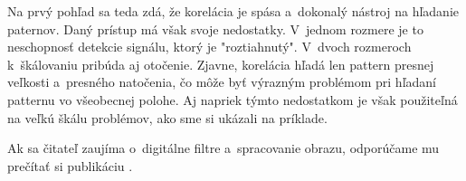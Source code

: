 Na prvý pohľad sa teda zdá, že korelácia je spása a~dokonalý nástroj
na hľadanie paternov. Daný prístup má však svoje nedostatky. V~jednom
rozmere je to neschopnosť detekcie signálu, ktorý je "roztiahnutý". 
V~dvoch rozmeroch k~škálovaniu pribúda aj otočenie. Zjavne, korelácia hľadá len
pattern presnej veľkosti a~presného natočenia, čo môže byť výrazným
problémom pri hľadaní patternu vo všeobecnej polohe. Aj napriek týmto
nedostatkom je však použiteľná na veľkú škálu problémov, ako sme si
ukázali na príklade.

\begin{poznamka}
    Ak sa čitateľ zaujíma o~digitálne filtre a~spracovanie obrazu,
    odporúčame mu prečítať si publikáciu \cite{dspguide}.
\end{poznamka}

